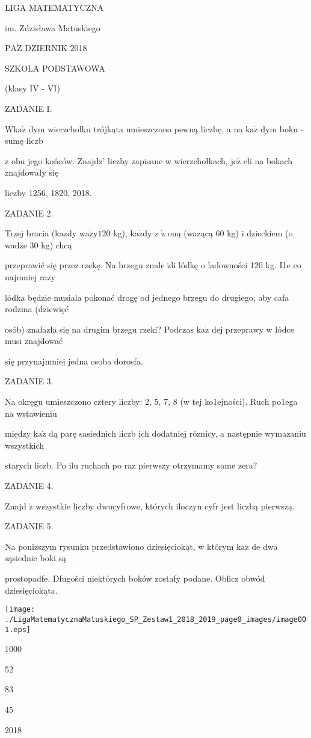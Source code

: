 \documentclass[a4paper,12pt]{article}
\begin{document}
LIGA MATEMATYCZNA

im. Zdzisława Matuskiego

$\mathrm{P}\mathrm{A}\dot{\mathrm{Z}}$ DZIERNIK 2018

SZKOLA PODSTAWOWA

(klasy IV - VI)

ZADANIE I.

$\mathrm{W}\mathrm{k}\mathrm{a}\dot{\mathrm{z}}$ dym wierzcholku trójkąta umieszczono pewną liczbę, a na $\mathrm{k}\mathrm{a}\dot{\mathrm{z}}$ dym boku - sumę liczb

z obu jego końców. Znajdz' liczby zapisane w wierzchołkach, $\mathrm{j}\mathrm{e}\dot{\mathrm{z}}$ eli na bokach znajdowały się

liczby 1256, 1820, 2018.

ZADANIE 2.

Trzej bracia (kazdy $\mathrm{w}\mathrm{a}\dot{\mathrm{z}}\mathrm{y}120$ kg), $\mathrm{k}\mathrm{a}\dot{\mathrm{z}}\mathrm{d}\mathrm{y}$ z $\dot{\mathrm{z}}$ oną (wazącą 60 kg) i dzieckiem (o wadze 30 kg) chcą

przeprawić się przez rzekę. Na brzegu znale $\acute{\mathrm{z}}\mathrm{l}\mathrm{i}$ lódkę o ladowności 120 kg. I1e co najmniej razy

lódka będzie musiala pokonać drogę od jednego brzegu do drugiego, aby cafa rodzina (dziewięć

osób) znalazla się na drugim brzegu rzeki? Podczas $\mathrm{k}\mathrm{a}\dot{\mathrm{z}}$ dej przeprawy w lódce musi znajdować

się przynajmniej jedna osoba dorosfa.

ZADANIE 3.

Na okręgu umieszczono cztery liczby: 2, 5, 7, 8 (w tej ko1ejności). Ruch po1ega na wstawieniu

między $\mathrm{k}\mathrm{a}\dot{\mathrm{z}}$ dą parę sasiednich liczb ich dodatniej róznicy, a następnie wymazaniu wszystkich

starych liczb. Po ilu ruchach po raz pierwszy otrzymamy same zera?

ZADANIE 4.

Znajd $\acute{\mathrm{z}}$ wszystkie liczby dwucyfrowe, których iloczyn cyfr jest liczbą pierwszą.

ZADANIE 5.

Na ponizszym rysunku przedstawiono dziesięciokąt, w którym $\mathrm{k}\mathrm{a}\dot{\mathrm{z}}$ de dwa sąsiednie boki są

prostopadfe. Dfugości niektórych boków zostafy podane. Oblicz obwód dziesięciokąta.
\begin{center}
\texttt{[image: ./LigaMatematycznaMatuskiego\_SP\_Zestaw1\_2018\_2019\_page0\_images/image001.eps]}
\end{center}
1000

52

83

45

2018
\end{document}

